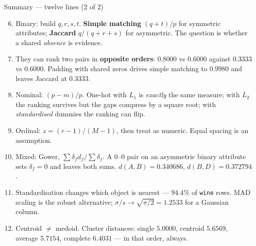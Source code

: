 \documentclass[aspectratio=169]{beamer}
\begin{document}
\begin{frame}[shrink=14]{Summary --- twelve lines (2 of 2)}
  \begin{enumerate}
    \setcounter{enumi}{5}
    \item Binary: build $q, r, s, t$. \textbf{Simple matching}
      $(q{+}t)/p$ for symmetric attributes; \textbf{Jaccard} $q/(q{+}r{+}s)$
      for asymmetric. The question is whether a shared \emph{absence} is
      evidence.
    \item They can rank two pairs in \textbf{opposite orders}: $0.8000$ vs
      $0.6000$ against $0.3333$ vs $0.6000$. Padding with shared zeros
      drives simple matching to $0.9980$ and leaves Jaccard at $0.3333$.
    \item Nominal: $(p-m)/p$. One-hot with $L_1$ is \emph{exactly} the same
      measure; with $L_2$ the ranking survives but the gaps compress by a
      square root; with \emph{standardised} dummies the ranking can flip.
    \item Ordinal: $z = (r-1)/(M-1)$, then treat as numeric. Equal spacing
      is an assumption.
    \item Mixed: Gower, $\sum \delta_f d_f / \sum \delta_f$. A $0$--$0$ pair
      on an asymmetric binary attribute sets $\delta_f = 0$ and leaves both
      sums. $d(A,B) = \mathbf{0.340686}$, $d(B,D) = \mathbf{0.372794}$.
    \item Standardisation changes which object is nearest ---
      $\mathbf{94.4\%}$ of \texttt{wine} rows. MAD scaling is the robust
      alternative; $\sigma/s \to \sqrt{\pi/2} = 1.2533$ for a Gaussian
      column.
    \item Centroid $\ne$ medoid. Cluster distances: single $5.0000$,
      centroid $5.6569$, average $5.7154$, complete $6.4031$ --- in that
      order, always.
  \end{enumerate}
\end{frame}
\end{document}
